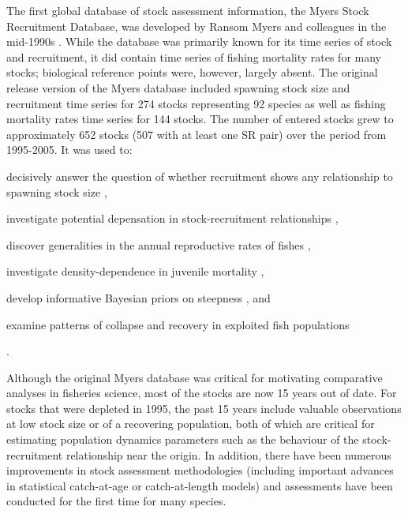 \documentclass[letterpaper,review,authoryear,12pt]{elsarticle}
\begin{document}
The first global database of stock assessment information, the Myers
Stock Recruitment Database, was developed by Ransom Myers and
colleagues in the mid-1990s \citep{Myers:etal:1995:summary}.  While
the database was primarily known for its time series of stock and
recruitment, it did contain time series of fishing mortality rates for
many stocks; biological reference points were, however, largely
absent. The original release version of the Myers database
\citep{Myers:etal:1995:summary} included spawning stock size and
recruitment time series for 274 stocks representing 92 species as well
as fishing mortality rates time series for 144 stocks. The number of
entered stocks grew to approximately 652 stocks (507 with at least one
SR pair) over the period from 1995-2005. It was used to:
\begin{inparaenum}[1\upshape)] \item decisively answer the question of
  whether recruitment shows any relationship to spawning stock size
  \citep{Myers:Barrowman:1996:fishbull}, \item investigate potential
  depensation in stock-recruitment relationships
  \citep{Myers:etal:1995:science, Liermann:Hilborn:1997:cjfas,
    Garvey:etal:2009:cjfas}, \item discover generalities in the annual
  reproductive rates of fishes \citep{Myers:etal:1999:cjfas,
    Myers:etal:2001:cjfas}, \item investigate density-dependence in
  juvenile mortality \citep{Myers:2001:ices, Minto:etal:2008:nature}, \item develop informative Bayesian priors on steepness
  \citep{Myers:etal:1999:cjfas, Myers:etal:2002:najfm,
    Dorn:2002:najfm}, and \item examine patterns of collapse and recovery in exploited fish populations \citep{Hilborn:1997:csiro, Hutchings:2000:nature, Hutchings:2001:jfishb} \end{inparaenum}.  


Although the original Myers database \citep{Myers:etal:1995:summary}
was critical for motivating comparative analyses in fisheries science, most of the stocks are now 15 years out of date.
For stocks that were depleted in 1995, the past 15 years
include valuable observations at low stock size or of a recovering
population, both of which are critical for estimating population
dynamics parameters such as the behaviour of the stock-recruitment
relationship near the origin. In addition, there have been numerous improvements in
stock assessment methodologies (including important advances in
statistical catch-at-age or catch-at-length models) and assessments
have been conducted for the first time for many species.
\end{document}

